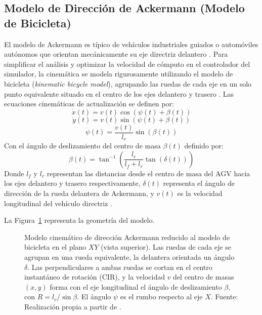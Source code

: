 \subsection{Modelo de Dirección de Ackermann (Modelo de Bicicleta)}
El modelo de Ackermann es típico de vehículos industriales guiados o automóviles autónomos que orientan mecánicamente su eje directriz delantero \citep{sivashangaran2023deep}. Para simplificar el análisis y optimizar la velocidad de cómputo en el controlador del simulador, la cinemática se modela rigurosamente utilizando el modelo de bicicleta (\textit{kinematic bicycle model}), agrupando las ruedas de cada eje en un solo punto equivalente situado en el centro de los ejes delantero y trasero \citep{sivashangaran2023deep}. Las ecuaciones cinemáticas de actualización se definen por:
\begin{equation}
    \dot{x}(t) = v(t) \cos(\psi(t) + \beta(t))
\end{equation}
\begin{equation}
    \dot{y}(t) = v(t) \sin(\psi(t) + \beta(t))
\end{equation}
\begin{equation}
    \dot{\psi}(t) = \frac{v(t)}{l_r} \sin(\beta(t))
\end{equation}
Con el ángulo de deslizamiento del centro de masa $\beta(t)$ definido por:
\begin{equation}
    \beta(t) = \tan^{-1}\left( \frac{l_r}{l_f + l_r} \tan(\delta(t)) \right)
\end{equation}
Donde $l_f$ y $l_r$ representan las distancias desde el centro de masa del AGV hacia los ejes delantero y trasero respectivamente, $\delta(t)$ representa el ángulo de dirección de la rueda delantera de Ackermann, y $v(t)$ es la velocidad longitudinal del vehículo directriz \citep{sivashangaran2023deep}.

La Figura~\ref{fig:cinematica_ackermann} representa la geometría del modelo.

\begin{figure}[htbp]
    \centering
    
    \caption[Modelo cinemático de dirección Ackermann]{Modelo cinemático de
    dirección Ackermann reducido al modelo de bicicleta en el plano $XY$
    (vista superior). Las ruedas de cada eje se agrupan en una rueda
    equivalente, la delantera orientada un ángulo $\delta$. Las
    perpendiculares a ambas ruedas se cortan en el centro instantáneo de
    rotación (CIR), y la velocidad $v$ del centro de masas $(x,y)$ forma
    con el eje longitudinal el ángulo de deslizamiento $\beta$, con
    $R=l_r/\sin\beta$. El ángulo $\psi$ es el rumbo respecto al eje $X$.
    Fuente:
    Realización propia a partir de \citet{sivashangaran2023deep}.}
    \label{fig:cinematica_ackermann}
\end{figure}

